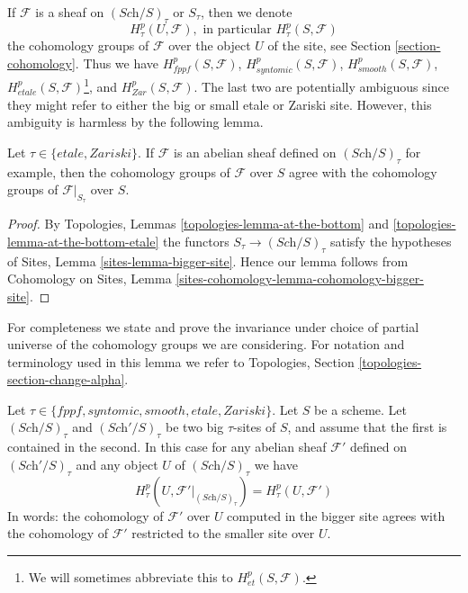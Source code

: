 \medskip\noindent
If $\mathcal{F}$ is a sheaf on $(\textit{Sch}/S)_\tau$ or $S_\tau$, then
we denote
$$
H^p_\tau(U, \mathcal{F}),\text{ in particular }
H^p_\tau(S, \mathcal{F})
$$
the cohomology groups of $\mathcal{F}$ over the object $U$ of the site, see
Section \ref{section-cohomology}. Thus we have
$H^p_{fppf}(S, \mathcal{F})$,
$H^p_{syntomic}(S, \mathcal{F})$,
$H^p_{smooth}(S, \mathcal{F})$,
$H^p_{etale}(S, \mathcal{F})$\footnote{We will sometimes abbreviate this
to $H^p_{et}(S, \mathcal{F})$.}, and
$H^p_{Zar}(S, \mathcal{F})$. The last two are potentially ambiguous since
they might refer to either the big or small etale or Zariski site. However,
this ambiguity is harmless by the following lemma.

\begin{lemma}
\label{lemma-compare-cohomology-big-small}
Let $\tau \in \{etale, Zariski\}$.
If $\mathcal{F}$ is an abelian sheaf defined on
$(\textit{Sch}/S)_\tau$ for example, then
the cohomology groups of $\mathcal{F}$ over $S$ agree with the cohomology
groups of $\mathcal{F}|_{S_\tau}$ over $S$.
\end{lemma}

\begin{proof}
By
Topologies, Lemmas \ref{topologies-lemma-at-the-bottom} and
\ref{topologies-lemma-at-the-bottom-etale}
the functors $S_\tau \to (\textit{Sch}/S)_\tau$
satisfy the hypotheses of
Sites, Lemma \ref{sites-lemma-bigger-site}.
Hence our lemma follows from
Cohomology on Sites, Lemma \ref{sites-cohomology-lemma-cohomology-bigger-site}.
\end{proof}

\noindent
For completeness we state and prove the invariance under choice of partial
universe of the cohomology groups we are considering. For notation and
terminology used in this lemma we refer to
Topologies, Section \ref{topologies-section-change-alpha}.

\begin{lemma}
\label{lemma-cohomology-enlarge-partial-universe}
Let $\tau \in \{fppf, syntomic, smooth, etale, Zariski\}$.
Let $S$ be a scheme.
Let $(\textit{Sch}/S)_\tau$ and $(\textit{Sch}'/S)_\tau$ be two
big $\tau$-sites of $S$, and assume that the first is contained in the second.
In this case for any abelian sheaf $\mathcal{F}'$ defined on
$(\textit{Sch}'/S)_\tau$ and any object $U$ of $(\textit{Sch}/S)_\tau$
we have
$$
H^p_\tau(U, \mathcal{F}'|_{(\textit{Sch}/S)_\tau})
=
H^p_\tau(U, \mathcal{F}')
$$
In words: the cohomology of $\mathcal{F}'$ over $U$ computed in the bigger site
agrees with the cohomology of $\mathcal{F}'$ restricted to the smaller site
over $U$.
\end{lemma}


